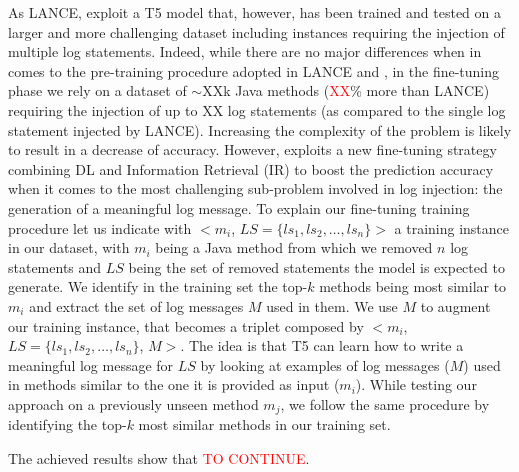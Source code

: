 As LANCE, \approach exploit a T5 model that, however, has been trained and tested on a larger and more challenging dataset including instances requiring the injection of multiple log statements. Indeed, while there are no major differences when in comes to the pre-training procedure adopted in LANCE and \approach, in the fine-tuning phase we rely on a dataset of $\sim$XXk Java methods (\textcolor{red}{XX}\% more than LANCE) requiring the injection of up to XX log statements (as compared to the single log statement injected by LANCE). Increasing the complexity of the problem is likely to result in a decrease of accuracy. However, \approach exploits a new fine-tuning strategy combining DL and Information Retrieval (IR) to boost the prediction accuracy when it comes to the most challenging sub-problem involved in log injection: the generation of a meaningful log message. To explain our fine-tuning training procedure let us indicate with $<$$m_i$, $LS=\{ls_1, ls_2, \dots, ls_n\}$$>$ a training instance in our dataset, with $m_i$ being a Java method from which we removed $n$ log statements and $LS$ being the set of removed statements the model is expected to generate. We identify in the training set the top-$k$ methods being most similar to $m_i$ and extract the set of log messages $M$ used in them. We use $M$ to augment our training instance, that becomes a triplet composed by $<$$m_i$, $LS=\{ls_1, ls_2, \dots, ls_n\}$, $M$$>$. The idea is that T5 can learn how to write a meaningful log message for $LS$ by looking at examples of log messages ($M$) used in methods similar to the one it is provided as input ($m_i$). While testing our approach on a previously unseen method $m_j$, we follow the same procedure by identifying the top-$k$ most similar methods in our training set.

The achieved results show that \textcolor{red}{TO CONTINUE}.